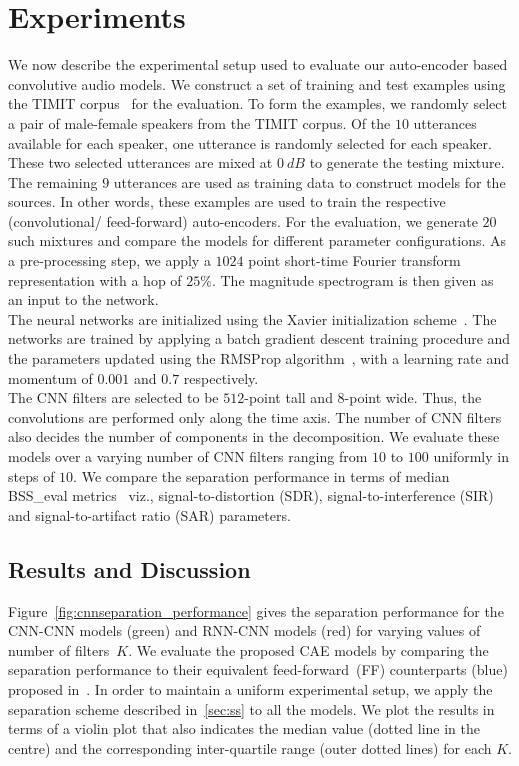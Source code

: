 \documentclass{article}
\begin{document}
\section{Experiments}
\label{sec:experiments}
We now describe the experimental setup used to evaluate our auto-encoder based convolutive audio models. We construct a set of training and test examples using the TIMIT corpus~\cite{timit} for the evaluation. To form the examples, we randomly select a pair of male-female speakers from the TIMIT corpus. Of the $10$ utterances available for each speaker, one utterance is randomly selected for each speaker. These two selected utterances are mixed at $0~dB$ to generate the testing mixture. The remaining $9$ utterances are used as training data to construct models for the sources. In other words, these examples are used to train the respective (convolutional/ feed-forward) auto-encoders. For the evaluation, we generate $20$ such mixtures and compare the models for different parameter configurations. As a pre-processing step, we apply a $1024$ point short-time Fourier transform representation with a hop of $25\%$. The magnitude spectrogram is then given as an input to the network. \\

The neural networks are initialized using the Xavier initialization scheme~\cite{glorot2010understanding}. The networks are trained by applying a batch gradient descent training procedure and the parameters updated using the RMSProp algorithm~\cite{tieleman2012rmsprop}, with a learning rate and momentum of $0.001$ and $0.7$ respectively. \\

The CNN filters are selected to be $512$-point tall and $8$-point wide. Thus, the convolutions are performed only along the time axis. The number of CNN filters also decides the number of components in the decomposition. We evaluate these models over a varying number of CNN filters ranging from $10$ to $100$ uniformly in steps of $10$. We compare the separation performance in terms of median BSS\_eval metrics~\cite{fevotte2005bss_eval} viz., signal-to-distortion (SDR), signal-to-interference (SIR) and signal-to-artifact ratio (SAR) parameters. \\

\subsection{Results and Discussion}
\label{subsec:results}
Figure~\ref{fig:cnnseparation_performance} gives the separation performance for the CNN-CNN models (green) and RNN-CNN models (red) for varying values of number of filters~$K$. We evaluate the proposed CAE models by comparing the separation performance to their equivalent feed-forward~(FF) counterparts (blue) proposed in~\cite{smaragdis2017aneural}. In order to maintain a uniform experimental setup, we apply the separation scheme described in~\ref{sec:ss} to all the models. We plot the results in terms of a violin plot that also indicates the median value (dotted line in the centre) and the corresponding inter-quartile range (outer dotted lines) for each $K$. \\
\end{document}
